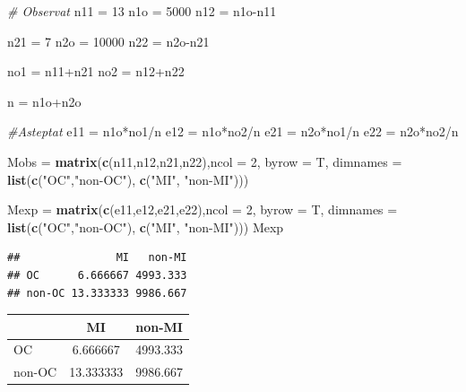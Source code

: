 \documentclass[]{article}
\newenvironment{Shaded}{\begin{snugshade}}{\end{snugshade}}
\newcommand{\KeywordTok}[1]{\textcolor[rgb]{0.13,0.29,0.53}{\textbf{{#1}}}}
\newcommand{\DataTypeTok}[1]{\textcolor[rgb]{0.13,0.29,0.53}{{#1}}}
\newcommand{\DecValTok}[1]{\textcolor[rgb]{0.00,0.00,0.81}{{#1}}}
\newcommand{\StringTok}[1]{\textcolor[rgb]{0.31,0.60,0.02}{{#1}}}
\newcommand{\CommentTok}[1]{\textcolor[rgb]{0.56,0.35,0.01}{\textit{{#1}}}}
\newcommand{\NormalTok}[1]{{#1}}
\begin{document}
\begin{Shaded}
\begin{Highlighting}[]
\CommentTok{# Observat}
\NormalTok{n11 =}\StringTok{ }\DecValTok{13}
\NormalTok{n1o =}\StringTok{ }\DecValTok{5000}
\NormalTok{n12 =}\StringTok{ }\NormalTok{n1o-n11}

\NormalTok{n21 =}\StringTok{ }\DecValTok{7}
\NormalTok{n2o =}\StringTok{ }\DecValTok{10000}
\NormalTok{n22 =}\StringTok{ }\NormalTok{n2o-n21}

\NormalTok{no1 =}\StringTok{ }\NormalTok{n11+n21}
\NormalTok{no2 =}\StringTok{ }\NormalTok{n12+n22}

\NormalTok{n =}\StringTok{ }\NormalTok{n1o+n2o}

\CommentTok{#Asteptat}
\NormalTok{e11 =}\StringTok{ }\NormalTok{n1o*no1/n}
\NormalTok{e12 =}\StringTok{ }\NormalTok{n1o*no2/n}
\NormalTok{e21 =}\StringTok{ }\NormalTok{n2o*no1/n}
\NormalTok{e22 =}\StringTok{ }\NormalTok{n2o*no2/n}

\NormalTok{Mobs =}\StringTok{ }\KeywordTok{matrix}\NormalTok{(}\KeywordTok{c}\NormalTok{(n11,n12,n21,n22),}\DataTypeTok{ncol =} \DecValTok{2}\NormalTok{, }\DataTypeTok{byrow =} \NormalTok{T, }
              \DataTypeTok{dimnames =} \KeywordTok{list}\NormalTok{(}\KeywordTok{c}\NormalTok{(}\StringTok{"OC"}\NormalTok{,}\StringTok{"non-OC"}\NormalTok{), }\KeywordTok{c}\NormalTok{(}\StringTok{"MI"}\NormalTok{, }\StringTok{"non-MI"}\NormalTok{)))}

\NormalTok{Mexp =}\StringTok{ }\KeywordTok{matrix}\NormalTok{(}\KeywordTok{c}\NormalTok{(e11,e12,e21,e22),}\DataTypeTok{ncol =} \DecValTok{2}\NormalTok{, }\DataTypeTok{byrow =} \NormalTok{T, }
              \DataTypeTok{dimnames =} \KeywordTok{list}\NormalTok{(}\KeywordTok{c}\NormalTok{(}\StringTok{"OC"}\NormalTok{,}\StringTok{"non-OC"}\NormalTok{), }\KeywordTok{c}\NormalTok{(}\StringTok{"MI"}\NormalTok{, }\StringTok{"non-MI"}\NormalTok{)))}
\NormalTok{Mexp}
\end{Highlighting}
\end{Shaded}

\begin{verbatim}
##               MI   non-MI
## OC      6.666667 4993.333
## non-OC 13.333333 9986.667
\end{verbatim}

\begin{longtable}[]{@{}lcc@{}}
\toprule
& MI & non-MI\tabularnewline
\midrule
\endhead
OC & 6.666667 & 4993.333\tabularnewline
non-OC & 13.333333 & 9986.667\tabularnewline
\bottomrule
\end{longtable}
\end{document}
